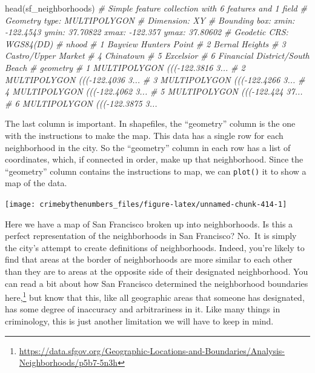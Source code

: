 \documentclass[
  a4paper,
]{krantz}
\makeatletter
\newenvironment{Shaded}{\begin{snugshade}}{\end{snugshade}}
\newcommand{\CommentTok}[1]{\textcolor[rgb]{0.56,0.35,0.01}{\textit{#1}}}
\newcommand{\FunctionTok}[1]{\textcolor[rgb]{0.00,0.00,0.00}{#1}}
\newcommand{\NormalTok}[1]{#1}
\newcommand{\SpecialCharTok}[1]{\textcolor[rgb]{0.00,0.00,0.00}{#1}}
\renewcommand{\href}[2]{#2\footnote{\url{#1}}}
\newenvironment{kframe}{%
\medskip{}
\setlength{\fboxsep}{.8em}
 \def\at@end@of@kframe{}%
 \ifinner\ifhmode%
  \def\at@end@of@kframe{\end{minipage}}%
  \begin{minipage}{\columnwidth}%
 \fi\fi%
 \def\FrameCommand##1{\hskip\@totalleftmargin \hskip-\fboxsep
 \colorbox{shadecolor}{##1}\hskip-\fboxsep
     \hskip-\linewidth \hskip-\@totalleftmargin \hskip\columnwidth}%
 \MakeFramed {\advance\hsize-\width
   \@totalleftmargin\z@ \linewidth\hsize
   \@setminipage}}%
 {\par\unskip\endMakeFramed%
 \at@end@of@kframe}
\renewenvironment{Shaded}{\begin{kframe}}{\end{kframe}}
\makeatother
\begin{document}
\begin{Shaded}
\begin{Highlighting}[]
\FunctionTok{head}\NormalTok{(sf\_neighborhoods)}
\CommentTok{\# Simple feature collection with 6 features and 1 field}
\CommentTok{\# Geometry type: MULTIPOLYGON}
\CommentTok{\# Dimension:     XY}
\CommentTok{\# Bounding box:  xmin: {-}122.4543 ymin: 37.70822 xmax: {-}122.357 ymax: 37.80602}
\CommentTok{\# Geodetic CRS:  WGS84(DD)}
\CommentTok{\#                            nhood}
\CommentTok{\# 1          Bayview Hunters Point}
\CommentTok{\# 2                 Bernal Heights}
\CommentTok{\# 3            Castro/Upper Market}
\CommentTok{\# 4                      Chinatown}
\CommentTok{\# 5                      Excelsior}
\CommentTok{\# 6 Financial District/South Beach}
\CommentTok{\#                         geometry}
\CommentTok{\# 1 MULTIPOLYGON ((({-}122.3816 3...}
\CommentTok{\# 2 MULTIPOLYGON ((({-}122.4036 3...}
\CommentTok{\# 3 MULTIPOLYGON ((({-}122.4266 3...}
\CommentTok{\# 4 MULTIPOLYGON ((({-}122.4062 3...}
\CommentTok{\# 5 MULTIPOLYGON ((({-}122.424 37...}
\CommentTok{\# 6 MULTIPOLYGON ((({-}122.3875 3...}
\end{Highlighting}
\end{Shaded}

The last column is important. In shapefiles, the
``geometry'' column is the one with the instructions to make
the map. This data has a single row for each neighborhood in
the city. So the ``geometry'' column in each row has a list
of coordinates, which, if connected in order, make up that
neighborhood. Since the ``geometry'' column contains the
instructions to map, we can \texttt{plot()} it to show a map
of the data.

\begin{Shaded}
\end{Shaded}

\begin{center}\texttt{[image: crimebythenumbers\_files/figure-latex/unnamed-chunk-414-1]} \end{center}

Here we have a map of San Francisco broken up into
neighborhoods. Is this a perfect representation of the
neighborhoods in San Francisco? No.~It is simply the city's
attempt to create definitions of neighborhoods. Indeed,
you're likely to find that areas at the border of
neighborhoods are more similar to each other than they are
to areas at the opposite side of their designated
neighborhood. You can read a bit about how San Francisco
determined the neighborhood boundaries
\href{https://data.sfgov.org/Geographic-Locations-and-Boundaries/Analysis-Neighborhoods/p5b7-5n3h}{here,}
but know that this, like all geographic areas that someone
has designated, has some degree of inaccuracy and
arbitrariness in it. Like many things in criminology, this
is just another limitation we will have to keep in mind.
\end{document}

